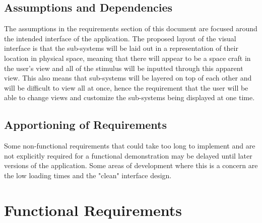 \documentclass[12pt, titlepage]{article}
\newcommand\tab[1][1cm]{\hspace*{#1}}
\begin{document}
\subsection{Assumptions and Dependencies}
\tab The assumptions in the requirements section of this document are focused around the intended interface of the application. The proposed layout of the visual interface is that the sub-systems will be laid out in a representation of their location in physical space, meaning that there will appear to be a space craft in the user's view and all of the stimulus will be inputted through this apparent view. This also means that sub-systems will be layered on top of each other and will be difficult to view all at once, hence the requirement that the user will be able to change views and customize the sub-systems being displayed at one time.

\subsection{Apportioning of Requirements}
\tab Some non-functional requirements that could take too long to implement and are not explicitly required for a functional demonstration may be delayed until later versions of the application. Some areas of development where this is a concern are the low loading times and the "clean" interface design.

\section{Functional Requirements}
\label{sec:functional_requirements}
\end{document}
